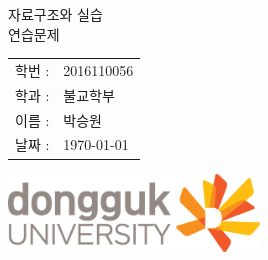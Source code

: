 \documentclass[11pt,a4paper]{article}
\begin{document}
\begin{center}
\vspace*{2cm}
{\fontsize{50}{50} 자료구조와 실습
\vspace{1cm}
\\연습문제}
\vspace{9cm}	

\LARGE
\begin{tabular}{rl}
학번 : & 2016110056\\ 
학과 : & 불교학부 \\
이름 : & 박승원\\
날짜 : & \today
\end{tabular}
\vspace{1cm}

\includegraphics[width=0.5\textwidth]{logo.jpg}

\end{center}
\newpage
\end{document}
